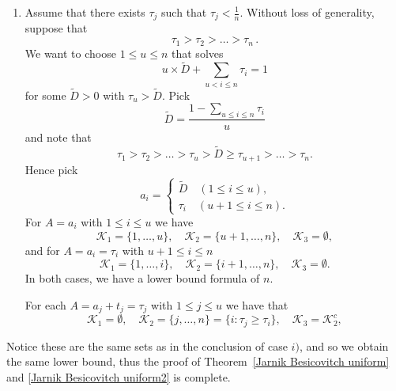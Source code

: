 \documentclass{amsart}
\theoremstyle{definition}
\newcommand{\0}{\mbf 0}%
\newcommand{\cK}{\mathcal{K}}
\begin{document}
\begin{enumerate}
    \item[ii.] Assume that there exists $\tau_{j}$ such that $\tau_{j}<\frac{1}{n}$. Without loss of generality, suppose that 
    \begin{equation*}
        \tau_{1}>\tau_{2}>\dots>\tau_{n}\, .
    \end{equation*}
    We want to choose $1\leq u \leq n$ that solves
    \begin{equation*}
        u \times \widetilde{D} + \sum\limits_{u < i \leq n}\tau_{i}=1
    \end{equation*}
    for some $\widetilde{D}>0$ with $\tau_{u}>\widetilde{D}$. Pick
    \begin{equation*}
        \widetilde{D}=\frac{1-\sum_{u\leq i \leq n}\tau_{i}}{u}
    \end{equation*}
    and note that
    \begin{equation*}
        \tau_{1}>\tau_{2}>\dots>\tau_{u}>\widetilde{D}\geq \tau_{u+1}>\dots > \tau_{n}.
    \end{equation*}
    Hence pick
    \begin{equation*}
        a_{i}=\begin{cases}
            \widetilde{D} \quad (1\leq i \leq u) , \\
            \tau_{i} \quad (u+1\leq i \leq n) .
        \end{cases}
    \end{equation*}
    For $A=a_{i}$ with $1\leq i \leq u$ we have
    \begin{equation*}
        \cK_{1}=\{ 1, \dots , u \}, \quad \cK_{2}=\{u+1, \dots , n\}, \quad \cK_{3}=\emptyset,
    \end{equation*}
    and for $A=a_{i}=\tau_{i}$ with $u+1\leq i \leq n$
    \begin{equation*}
        \cK_{1}=\{1, \dots , i \}, \quad \cK_{2}= \{i+1, \dots , n\}, \quad \cK_{3}=\emptyset.
    \end{equation*}
    In both cases, we have a lower bound formula of $n$. \par 
    For each $A=a_{j}+t_{j}=\tau_{j}$ with $1\leq j \leq u$ we have that
    \begin{equation*}
        \cK_{1}=\emptyset , \quad \cK_{2}=\{ j, \dots , n\}=\{i: \tau_{j}\geq \tau_{i}\}, \quad \cK_{3}=\cK_{2}^{c},
    \end{equation*}
   
\end{enumerate}
 Notice these are the same sets as in the conclusion of case $i)$, and so we obtain the same lower bound, thus the proof of Theorem~\ref{Jarnik Besicovitch uniform} and \ref{Jarnik Besicovitch uniform2} is complete.
\end{document}
